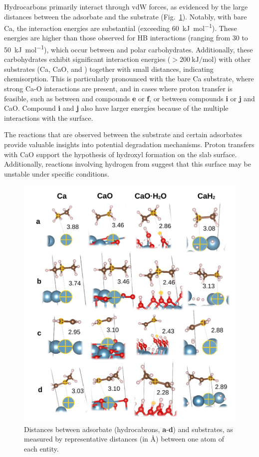 \documentclass[journal=jpccck,manuscript=article]{achemso}
\begin{document}
Hydrocarbons primarily interact through vdW forces, as evidenced by the large distances between the adsorbate and the substrate (Fig.~\ref{fig:distsad}). Notably, with bare Ca, the interaction energies are substantial (exceeding \SI{60}{\kilo\joule\per\mole}). These energies are higher than those observed for HB interactions (ranging from 30 to \SI{50}{\kilo\joule\per\mole}), which occur between  and polar carbohydrates. Additionally, these carbohydrates exhibit significant interaction energies ($>\SI{200}{\kilo\joule\per\mole}$) with other substrates (Ca, CaO, and ) together with small distances, indicating chemisorption. This is particularly pronounced with the bare Ca substrate, where strong Ca-O interactions are present, and in cases where proton transfer is feasible, such as between  and compounds \textbf{e} or \textbf{f}, or between compounds \textbf{i} or \textbf{j} and CaO. Compound \textbf{i} and \textbf{j} also have larger energies because of the multiple interactions with the surface.

The reactions that are observed between the substrate and certain adsorbates provide valuable insights into potential degradation mechanisms. Proton transfers with CaO support the hypothesis of hydroxyl formation on the slab surface. Additionally, reactions involving hydrogen from  suggest that this surface may be unstable under specific conditions.



\begin{figure}[!h]
	\centering
	\includegraphics[width=.7\linewidth]{Figure7}
	\caption{Distances between adsorbate (hydrocabrons, \textbf{a}-\textbf{d}) and substrates, as measured by representative distances (in \si{\angstrom}) between one atom of each entity.}
	\label{fig:distsad}
\end{figure}
\end{document}
